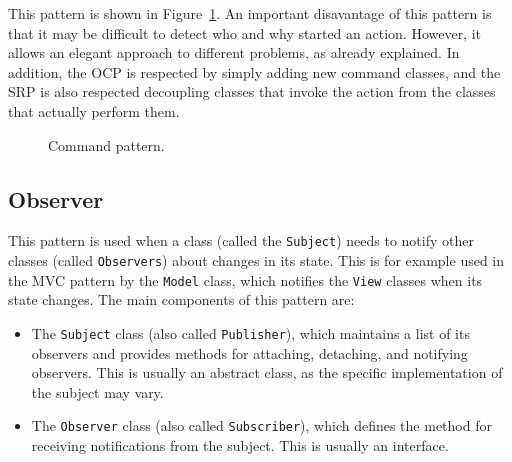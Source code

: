 This pattern is shown in Figure~\ref{fig:command}. An important disavantage of this pattern is that it may be difficult to detect who and why started an action. However, it allows an elegant approach to different problems, as already explained. In addition, the OCP is respected by simply adding new command classes, and the SRP is also respected decoupling classes that invoke the action from the classes that actually perform them.
\begin{figure}
    \centering
    \caption{Command pattern.}
    \label{fig:command}
\end{figure}

\subsection{Observer}

This pattern is used when a class (called the \texttt{Subject}) needs to notify other classes (called \texttt{Observers}) about changes in its state. This is for example used in the MVC pattern by the \texttt{Model} class, which notifies the \texttt{View} classes when its state changes. The main components of this pattern are:
\begin{itemize}
    \item The \texttt{Subject} class (also called \texttt{Publisher}), which maintains a list of its observers and provides methods for attaching, detaching, and notifying observers. This is usually an abstract class, as the specific implementation of the subject may vary.
    \item The \texttt{Observer} class (also called \texttt{Subscriber}), which defines the method for receiving notifications from the subject. This is usually an interface.
\end{itemize}

